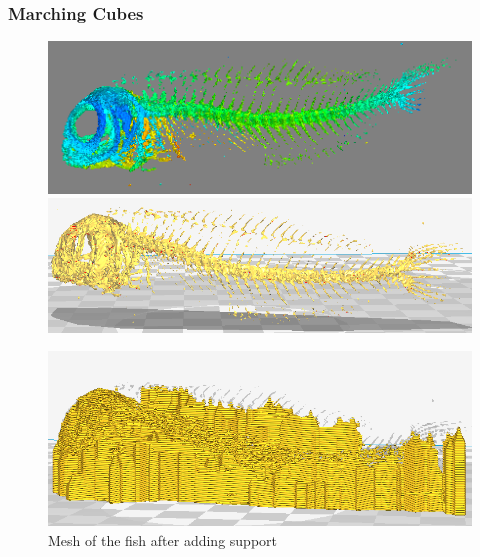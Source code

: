 \documentclass[9pt]{beamer}
\begin{document}
\begin{frame}
\frametitle{Marching Cubes}
\begin{figure}
\centering
\begin{minipage}{.5\textwidth}
  \centering
  \includegraphics[scale=0.3]{Images/mayavi}
\end{minipage}%
\begin{minipage}{.5\textwidth}
  \centering
  \includegraphics[scale=0.22]{Images/cura_fish}
\end{minipage}
\end{figure}
\begin{figure}
\includegraphics[scale=0.2]{Images/cura_supports}
\caption{Mesh of the fish after adding support}
\end{figure}
\end{frame}
\end{document}
